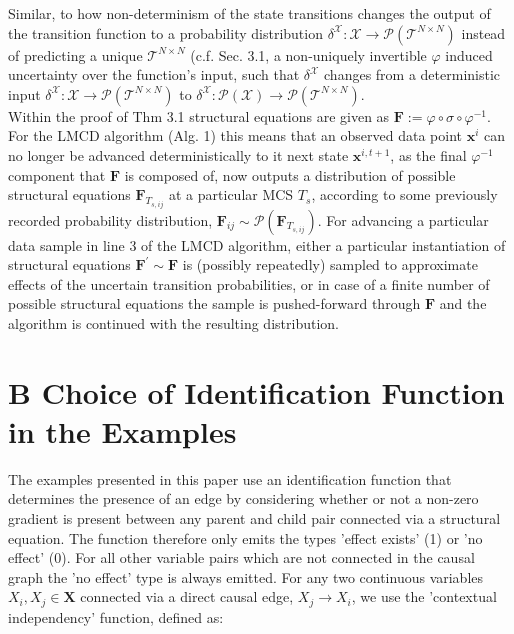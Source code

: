 \documentclass[10pt]{article}
\begin{document}
Similar, to how non-determinism of the state transitions changes the output of the transition function to a probability distribution $\delta^{\mathcal{X}}: \mathcal{X} \rightarrow \mathcal{P}\left(\mathcal{T}^{N \times N}\right)$ instead of predicting a unique $\mathcal{T}^{N \times N}$ (c.f. Sec. 3.1, a non-uniquely invertible $\varphi$ induced uncertainty over the function's input, such that $\delta^{\mathcal{X}}$ changes from a deterministic input $\delta^{\mathcal{X}}: \mathcal{X} \rightarrow \mathcal{P}\left(\mathcal{T}^{N \times N}\right)$ to $\delta^{\mathcal{X}}: \mathcal{P}(\mathcal{X}) \rightarrow \mathcal{P}\left(\mathcal{T}^{N \times N}\right)$.\\
Within the proof of Thm 3.1 structural equations are given as $\mathbf{F}:=\varphi \circ \sigma \circ \varphi^{-1}$. For the LMCD algorithm (Alg. 1) this means that an observed data point $\mathbf{x}^{i}$ can no longer be advanced deterministically to it next state $\mathbf{x}^{i, t+1}$, as the final $\varphi^{-1}$ component that $\mathbf{F}$ is composed of, now outputs a distribution of possible structural equations $\mathbf{F}_{T_{s, i j}}$ at a particular MCS $T_{s}$, according to some previously recorded probability distribution, $\mathbf{F}_{i j} \sim \mathcal{P}\left(\mathbf{F}_{T_{s, i j}}\right)$. For advancing a particular data sample in line 3 of the LMCD algorithm, either a particular instantiation of structural equations $\mathbf{F}^{\prime} \sim \mathbf{F}$ is (possibly repeatedly) sampled to approximate effects of the uncertain transition probabilities, or in case of a finite number of possible structural equations the sample is pushed-forward through $\mathbf{F}$ and the algorithm is continued with the resulting distribution.

\section*{B Choice of Identification Function in the Examples}
The examples presented in this paper use an identification function that determines the presence of an edge by considering whether or not a non-zero gradient is present between any parent and child pair connected via a structural equation. The function therefore only emits the types 'effect exists' (1) or 'no effect' (0). For all other variable pairs which are not connected in the causal graph the 'no effect' type is always emitted. For any two continuous variables $X_{i}, X_{j} \in \mathbf{X}$ connected via a direct causal edge, $X_{j} \rightarrow X_{i}$, we use the 'contextual independency' function, defined as:
\end{document}
